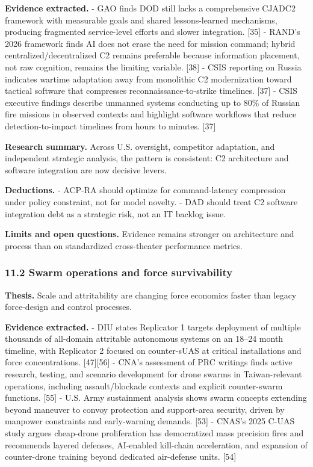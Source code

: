 \documentclass[11pt]{article}
\begin{document}
\textbf{Evidence extracted.} - GAO finds DOD still lacks a comprehensive
CJADC2 framework with measurable goals and shared lessons-learned
mechanisms, producing fragmented service-level efforts and slower
integration. {[}35{]} - RAND's 2026 framework finds AI does not erase
the need for mission command; hybrid centralized/decentralized C2
remains preferable because information placement, not raw cognition,
remains the limiting variable. {[}38{]} - CSIS reporting on Russia
indicates wartime adaptation away from monolithic C2 modernization
toward tactical software that compresses reconnaissance-to-strike
timelines. {[}37{]} - CSIS executive findings describe unmanned systems
conducting up to 80\% of Russian fire missions in observed contexts and
highlight software workflows that reduce detection-to-impact timelines
from hours to minutes. {[}37{]}

\textbf{Research summary.} Across U.S. oversight, competitor adaptation,
and independent strategic analysis, the pattern is consistent: C2
architecture and software integration are now decisive levers.

\textbf{Deductions.} - ACP-RA should optimize for command-latency
compression under policy constraint, not for model novelty. - DAD should
treat C2 software integration debt as a strategic risk, not an IT
backlog issue.

\textbf{Limits and open questions.} Evidence remains stronger on
architecture and process than on standardized cross-theater performance
metrics.

\hypertarget{swarm-operations-and-force-survivability}{%
\subsubsection{11.2 Swarm operations and force
survivability}\label{swarm-operations-and-force-survivability}}

\textbf{Thesis.} Scale and attritability are changing force economics
faster than legacy force-design and control processes.

\textbf{Evidence extracted.} - DIU states Replicator 1 targets
deployment of multiple thousands of all-domain attritable autonomous
systems on an 18--24 month timeline, with Replicator 2 focused on
counter-sUAS at critical installations and force concentrations.
{[}47{]}{[}56{]} - CNA's assessment of PRC writings finds active
research, testing, and scenario development for drone swarms in
Taiwan-relevant operations, including assault/blockade contexts and
explicit counter-swarm functions. {[}55{]} - U.S. Army sustainment
analysis shows swarm concepts extending beyond maneuver to convoy
protection and support-area security, driven by manpower constraints and
early-warning demands. {[}53{]} - CNAS's 2025 C-UAS study argues
cheap-drone proliferation has democratized mass precision fires and
recommends layered defenses, AI-enabled kill-chain acceleration, and
expansion of counter-drone training beyond dedicated air-defense units.
{[}54{]}
\end{document}

